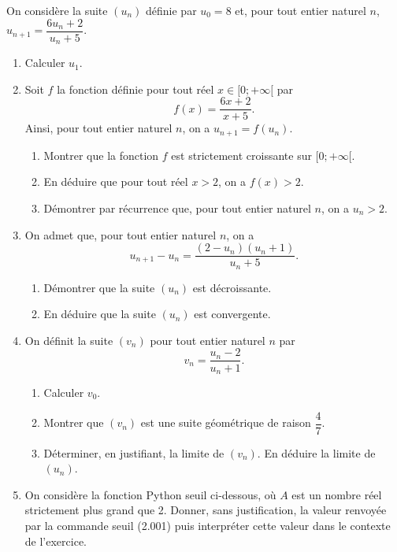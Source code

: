 \documentclass[11pt,fleqn, openany]{book} %
\begin{document}
\begin{exercise}[subtitle={(Réunion 2023)}]
On considère la suite $(u_n)$ définie par $u_0=8$ et, pour tout entier naturel $n$, $u_{n+1}=\dfrac{6u_n+2}{u_n+5}$.
\begin{enumerate}
\item Calculer $u_1$.
\item Soit $f$ la fonction définie pour tout réel  $x\in [0;+\infty[$ par
\[f(x)=\dfrac{6x+2}{x+5}.\]
Ainsi, pour tout entier naturel $n$, on a $u_{n+1}=f(u_n)$.
\begin{enumerate}
\item Montrer que la fonction $f$ est strictement croissante sur $[0;+\infty [$.
\item En déduire que pour tout réel $x>2$, on a $f(x)>2$.
\item Démontrer par récurrence que, pour tout entier naturel $n$, on a $u_n >2$.
\end{enumerate}
\item On admet que, pour tout entier naturel $n$, on a 
\[u_{n+1}-u_n=\dfrac{(2-u_n)(u_n+1)}{u_n+5}.\]
\begin{enumerate}\item Démontrer que la suite $(u_n)$ est décroissante.
\item En déduire que la suite $(u_n)$ est convergente.\end{enumerate}

\item On définit la suite $(v_n)$ pour tout entier naturel $n$ par 
\[v_n=\dfrac{u_n-2}{u_n+1}.\]
\begin{enumerate}
\item Calculer $v_0$.
\item Montrer que $(v_n)$ est une suite géométrique de raison $\dfrac{4}{7}$.
\item Déterminer, en justifiant, la limite de $(v_n)$. En déduire la limite de $(u_n)$.
\end{enumerate}
\item On considère la fonction Python seuil ci-dessous, où $A$ est un nombre réel strictement plus grand que 2. Donner, sans justification, la valeur renvoyée par la commande seuil (2.001) puis
interpréter cette valeur dans le contexte de l'exercice.



\end{enumerate}
\end{exercise}
\end{document}
